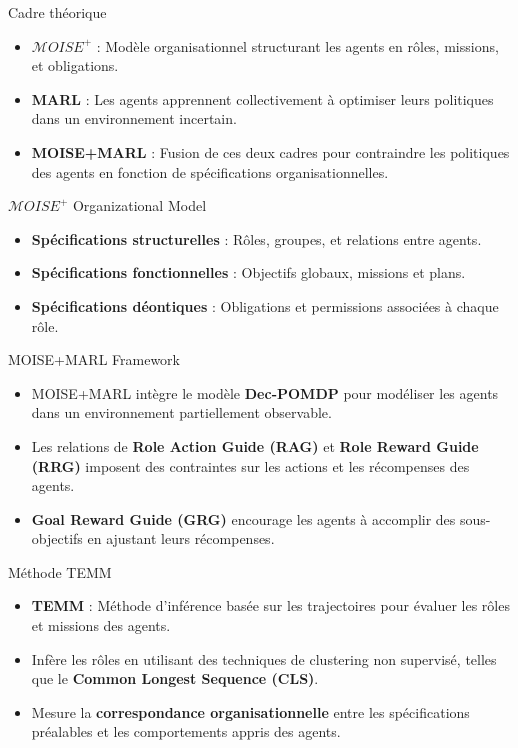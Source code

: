 \documentclass{beamer}
\begin{document}
\begin{frame}{Cadre théorique}
    \begin{itemize}
        \item \textbf{$\mathcal{M}OISE^+$} : Modèle organisationnel structurant les agents en rôles, missions, et obligations.
        \item \textbf{MARL} : Les agents apprennent collectivement à optimiser leurs politiques dans un environnement incertain.
        \item \textbf{MOISE+MARL} : Fusion de ces deux cadres pour contraindre les politiques des agents en fonction de spécifications organisationnelles.
    \end{itemize}
\end{frame}

\begin{frame}{$\mathcal{M}OISE^+$ Organizational Model}
    \begin{itemize}
        \item \textbf{Spécifications structurelles} : Rôles, groupes, et relations entre agents.
        \item \textbf{Spécifications fonctionnelles} : Objectifs globaux, missions et plans.
        \item \textbf{Spécifications déontiques} : Obligations et permissions associées à chaque rôle.
    \end{itemize}
\end{frame}

\begin{frame}{MOISE+MARL Framework}
    \begin{itemize}
        \item MOISE+MARL intègre le modèle \textbf{Dec-POMDP} pour modéliser les agents dans un environnement partiellement observable.
        \item Les relations de \textbf{Role Action Guide (RAG)} et \textbf{Role Reward Guide (RRG)} imposent des contraintes sur les actions et les récompenses des agents.
        \item \textbf{Goal Reward Guide (GRG)} encourage les agents à accomplir des sous-objectifs en ajustant leurs récompenses.
    \end{itemize}
\end{frame}

\begin{frame}{Méthode TEMM}
    \begin{itemize}
        \item \textbf{TEMM} : Méthode d'inférence basée sur les trajectoires pour évaluer les rôles et missions des agents.
        \item Infère les rôles en utilisant des techniques de clustering non supervisé, telles que le \textbf{Common Longest Sequence (CLS)}.
        \item Mesure la \textbf{correspondance organisationnelle} entre les spécifications préalables et les comportements appris des agents.
    \end{itemize}
\end{frame}
\end{document}
